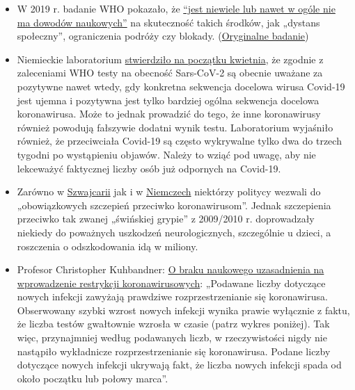 \begin{itemize}
{  posłuszeństwa''}.
\item
  W 2019 r. badanie WHO pokazało, że
  \href{https://www.heise.de/tp/features/COVID-19-WHO-Studie-findet-kaum-Belege-fuer-die-Wirksamkeit-von-Eindaemmungsmassnahmen-4706446.html}{``jest
  niewiele lub nawet w ogóle nie ma dowodów naukowych''} na skuteczność
  takich środków, jak „dystans społeczny'', ograniczenia podróży czy
  blokady.
  (\href{https://www.who.int/influenza/publications/public_health_measures/publication/en/}{Oryginalne
  badanie})
\item
  Niemieckie laboratorium
  \href{http://www.labor-augsburg-mvz.de/de/aktuelles/coronavirus}{stwierdziło
  na początku kwietnia}, że zgodnie z zaleceniami WHO testy na obecność
  Sars-CoV-2 są obecnie uważane za pozytywne nawet wtedy, gdy konkretna
  sekwencja docelowa wirusa Covid-19 jest ujemna i pozytywna jest tylko
  bardziej ogólna sekwencja docelowa koronawirusa. Może to jednak
  prowadzić do tego, że inne koronawirusy również powodują fałszywie
  dodatni wynik testu. Laboratorium wyjaśniło również, że przeciwciała
  Covid-19 są często wykrywalne tylko dwa do trzech tygodni po
  wystąpieniu objawów. Należy to wziąć pod uwagę, aby nie lekceważyć
  faktycznej liczby osób już odpornych na Covid-19.
\item
  Zarówno w
  \href{https://www.20min.ch/schweiz/news/story/-rzte-und-Politiker-fordern-Corona-Impfzwang-20853917}{Szwajcarii}
  jak i w
  \href{https://www.faz.net/agenturmeldungen/dpa/soeder-waere-fuer-deutschlandweite-impfpflicht-gegen-corona-16738369.html}{Niemczech}
  niektórzy politycy wezwali do „obowiązkowych szczepień przeciwko
  koronawirusom''. Jednak szczepienia przeciwko tak zwanej „świńskiej
  grypie'' z 2009/2010 r. doprowadzały niekiedy do poważnych uszkodzeń
  neurologicznych, szczególnie u dzieci, a roszczenia o odszkodowania
  idą w miliony.
\item
  Profesor Christopher Kuhbandner:
  \href{https://www.heise.de/tp/features/Von-der-fehlenden-wissenschaftlichen-Begruendung-der-Corona-Massnahmen-4709563.html?seite=all}{O
  braku naukowego uzasadnienia na wprowadzenie restrykcji
  koronawirusowych}: „Podawane liczby dotyczące nowych infekcji zawyżają
  prawdziwe rozprzestrzenianie się koronawirusa. Obserwowany szybki
  wzrost nowych infekcji wynika prawie wyłącznie z faktu, że liczba
  testów gwałtownie wzrosła w czasie (patrz wykres poniżej). Tak więc,
  przynajmniej według podawanych liczb, w rzeczywistości nigdy nie
  nastąpiło wykładnicze rozprzestrzenianie się koronawirusa. Podane
  liczby dotyczące nowych infekcji ukrywają fakt, że liczba nowych
  infekcji spada od około początku lub połowy marca''.
\end{itemize}

